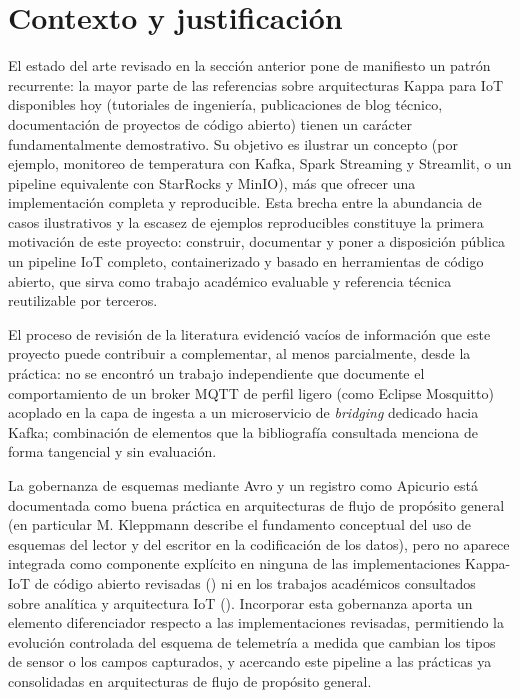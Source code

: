 \section{Contexto y justificación}

El estado del arte revisado en la sección anterior pone de manifiesto un patrón recurrente: la mayor parte de las referencias sobre arquitecturas Kappa para IoT disponibles hoy (tutoriales de ingeniería, publicaciones de blog técnico, documentación de proyectos de código abierto) tienen un carácter fundamentalmente demostrativo. Su objetivo es ilustrar un concepto (por ejemplo, monitoreo de temperatura con Kafka, Spark Streaming y Streamlit, o un pipeline equivalente con StarRocks y MinIO), más que ofrecer una implementación completa y reproducible. Esta brecha entre la abundancia de casos ilustrativos y la escasez de ejemplos reproducibles constituye la primera motivación de este proyecto: construir, documentar y poner a disposición pública un pipeline IoT completo, containerizado y basado en herramientas de código abierto, que sirva como trabajo académico evaluable y referencia técnica reutilizable por terceros.

El proceso de revisión de la literatura evidenció vacíos de información que este proyecto puede contribuir a complementar, al menos parcialmente, desde la práctica: no se encontró un trabajo independiente que documente el comportamiento de un broker MQTT de perfil ligero (como Eclipse Mosquitto) acoplado en la capa de ingesta a un microservicio de \textit{bridging} dedicado hacia Kafka; combinación de elementos que la bibliografía consultada menciona de forma tangencial y sin evaluación.

La gobernanza de esquemas mediante Avro y un registro como Apicurio está documentada como buena práctica en arquitecturas de flujo de propósito general (en particular M. Kleppmann \cite{kleppmann2017} describe el fundamento conceptual del uso de esquemas del lector y del escritor en la codificación de los datos), pero no aparece integrada como componente explícito en ninguna de las implementaciones Kappa-IoT de código abierto revisadas (\cite{shinde2025,zefkilis2025}) ni en los trabajos académicos consultados sobre analítica y arquitectura IoT (\cite{liu2025,dominguez2022,caowachowicz2019}). Incorporar esta gobernanza aporta un elemento diferenciador respecto a las implementaciones revisadas, permitiendo la evolución controlada del esquema de telemetría a medida que cambian los tipos de sensor o los campos capturados, y acercando este pipeline a las prácticas ya consolidadas en arquitecturas de flujo de propósito general.

